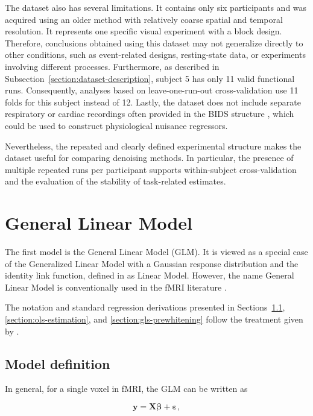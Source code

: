 \documentclass[english]{pwr_wmat_praca_dyplomowa}
\theoremstyle{definition}
\theoremstyle{remark}
\begin{document}
The dataset also has several limitations. It contains only six participants and was acquired using an older method with relatively coarse spatial and temporal resolution. It represents one specific visual experiment with a block design. Therefore, conclusions obtained using this dataset may not generalize directly to other conditions, such as event-related designs, resting-state data, or experiments involving different processes. Furthermore, as described in Subsection~\ref{section:dataset-description}, subject 5 has only 11 valid functional runs. Consequently, analyses based on leave-one-run-out cross-validation use 11 folds for this subject instead of 12. Lastly, the dataset does not include separate respiratory or cardiac recordings often provided in the BIDS structure \cite{BIDS}, which could be used to construct physiological nuisance regressors. 

Nevertheless, the repeated and clearly defined experimental structure makes the dataset useful for comparing denoising methods. In particular, the presence of multiple repeated runs per participant supports within-subject cross-validation and the evaluation of the stability of task-related estimates.

\newpage
\chapter{General Linear Model}
\label{chapter:glm}

The first model is the General Linear Model (GLM). It is viewed as a special case of the Generalized Linear Model with a Gaussian response distribution and the identity link function, defined in \cite[Section 1.1.4]{agresti} as Linear Model. However, the name General Linear Model is conventionally used in the fMRI literature \cite{spm-filter}.

The notation and standard regression derivations presented in Sections~\ref{section:model-definition}, \ref{section:ols-estimation}, and \ref{section:gls-prewhitening} follow the treatment given by \cite{agresti}.

\section{Model definition}
\label{section:model-definition}

In general, for a single voxel in fMRI, the GLM can be written as

\begin{equation}
    \mathbf{y} = \mathbf{X}\boldsymbol{\beta} + \boldsymbol{\varepsilon},
\end{equation}
\end{document}
